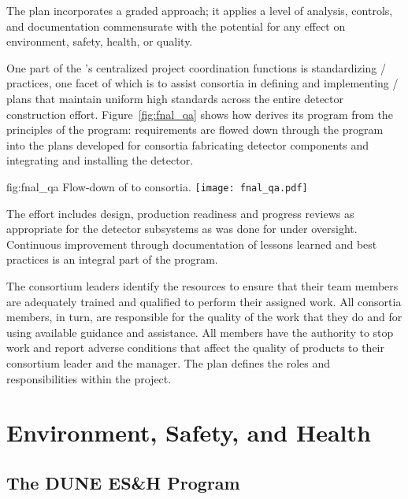 The   plan incorporates 
a graded approach; it applies a level of analysis,
controls, and documentation commensurate with the potential for any effect on
environment, safety, health, or quality.

One part of the 's centralized project
coordination functions is
standardizing / practices, one facet
of which is to assist consortia in defining and implementing
/ plans that maintain uniform high
standards across the entire detector construction
effort. Figure~\ref{fig:fnal_qa} shows how  
derives its  program from the principles of the \fnal {} program:
requirements are flowed down through the 
 program into the  plans developed for consortia fabricating detector components and integrating and installing the detector.

\begin{dunefigure}[\fnal QA]{fig:fnal_qa}
  {Flow-down of \fnal {} to consortia.}
  \texttt{[image: fnal\_qa.pdf]}
\end{dunefigure}

The  effort includes design, production readiness and
progress reviews as appropriate for the  detector
subsystems as was done for  under 
oversight. Continuous improvement through documentation of lessons learned and best practices is
an integral part of the program. 


The  consortium leaders identify the
resources to ensure that their team members are adequately trained and
qualified to perform their assigned work. 
All consortia members, in turn, are responsible for the quality of the work that
they do and for using available guidance and assistance. All members 
have the authority to stop work and report adverse conditions that
affect the quality of  products to their 
 consortium leader and the 
 manager. The  plan
defines the  roles and responsibilities within the 
project.


\section{Environment, Safety, and Health}
\label{sec:es-tc-eshq}

\subsection{The DUNE ES\&H Program}
\label{sec:es-tc-eshq-prog}

